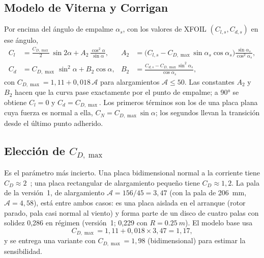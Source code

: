 \subsection{Modelo de Viterna y Corrigan}
Por encima del ángulo de empalme $\alpha_s$, con los valores de XFOIL $(C_{l,s},C_{d,s})$
en ese ángulo,
\begin{align}
  C_l&=\frac{C_{D,\max}}{2}\,\sin2\alpha+A_2\,\frac{\cos^2\alpha}{\sin\alpha},&
  A_2&=\bigl(C_{l,s}-C_{D,\max}\sin\alpha_s\cos\alpha_s\bigr)\frac{\sin\alpha_s}{\cos^2\alpha_s},
  \label{eq:polares-vc-cl}\\
  C_d&=C_{D,\max}\,\sin^2\alpha+B_2\cos\alpha,&
  B_2&=\frac{C_{d,s}-C_{D,\max}\sin^2\alpha_s}{\cos\alpha_s},
  \label{eq:polares-vc-cd}
\end{align}
con $C_{D,\max}=1{,}11+0{,}018\,\mathcal{A}$ para alargamientos $\mathcal A\le50$. Las
constantes $A_2$ y $B_2$ hacen que la curva pase exactamente por el punto de empalme; a
\ang{90} se obtiene $C_l=0$ y $C_d=C_{D,\max}$. Los primeros términos son los de una placa
plana cuya fuerza es normal a ella, $C_N=C_{D,\max}\sin\alpha$; los segundos llevan la
transición desde el último punto adherido.

\subsection{Elección de $C_{D,\max}$}
Es el parámetro más incierto. Una placa bidimensional normal a la corriente tiene
$C_D\approx2$~\cite{hoerner1965}; una placa rectangular de alargamiento pequeño tiene
$C_D\approx1{,}2$. La pala de la versión~1, de alargamiento $\mathcal A=156/45=3{,}47$ (con la pala de \SI{206}{mm}, $\mathcal A=4{,}58$), está entre ambos
casos: es una placa aislada en el arranque (rotor parado, pala casi normal al viento) y
forma parte de un disco de cuatro palas con solidez 0,286 en régimen (versión~1; 0,229 con $R=\SI{0.25}{m}$). El modelo base usa
\begin{equation}
  C_{D,\max}=1{,}11+0{,}018\times3{,}47=1{,}17 ,
  \label{eq:polares-cdmax}
\end{equation}
y se entrega una variante con $C_{D,\max}=1{,}98$ (bidimensional) para estimar la
sensibilidad.

